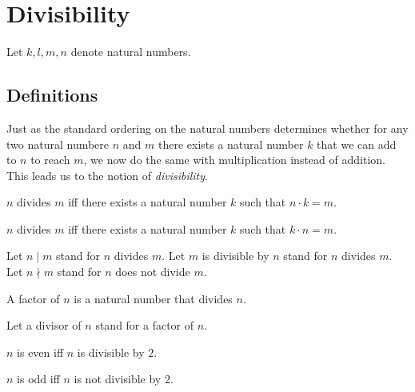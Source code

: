 \documentclass[../../arithmetic.tex]{subfiles}
\begin{document}
  \section{Divisibility}

  \begin{forthel}
  \end{forthel}

  \begin{forthel}
  \end{forthel}

  \begin{forthel}
  \end{forthel}

  \begin{forthel}
    Let $k, l, m, n$ denote natural numbers.
  \end{forthel}


  \subsection{Definitions}

  Just as the standard ordering on the natural numbers determines whether for
  any two natural numbere $n$ and $m$ there exists a natural number $k$ that we
  can add to $n$ to reach $m$, we now do the same with multiplication instead of
  addition. This leads us to the notion of \textit{divisibility}.

  \begin{forthel}
    \begin{definition}
      $n$ divides $m$ iff there exists a natural number $k$ such that $n \cdot k = m$.
    \end{definition}

    \begin{lemma}\label{Arithmetic_03_01_926592}
      $n$ divides $m$ iff there exists a natural number $k$ such that $k \cdot n = m$.
    \end{lemma}

    Let $n \mid m$ stand for $n$ divides $m$.
    Let $m$ is divisible by $n$ stand for $n$ divides $m$.
    Let $n \nmid m$ stand for $n$ does not divide $m$.

    \begin{definition}
      A factor of $n$ is a natural number that divides $n$.
    \end{definition}

    Let a divisor of $n$ stand for a factor of $n$.

    \begin{definition}
      $n$ is even iff $n$ is divisible by $2$.
    \end{definition}

    \begin{definition}
      $n$ is odd iff $n$ is not divisible by $2$.
    \end{definition}
  \end{forthel}
\end{document}

